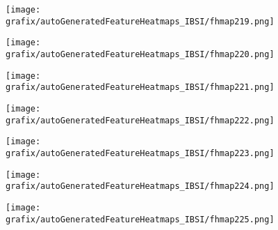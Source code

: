 \hspace{\hsp} 
\begin{subfigure}{\wid\textwidth} 
    \centering 
    \caption{\tiny \sffamily {}} 
    \vspace{\vsp} 
    \texttt{[image: grafix/autoGeneratedFeatureHeatmaps\_IBSI/fhmap219.png]} 
\end{subfigure} 
\hspace{\hsp} 
\begin{subfigure}{\wid\textwidth} 
    \centering 
    \caption{\tiny \sffamily {}} 
    \vspace{\vsp} 
    \texttt{[image: grafix/autoGeneratedFeatureHeatmaps\_IBSI/fhmap220.png]} 
\end{subfigure} 
\hspace{\hsp} 
\begin{subfigure}{\wid\textwidth} 
    \centering 
    \caption{\tiny \sffamily {}} 
    \vspace{\vsp} 
    \texttt{[image: grafix/autoGeneratedFeatureHeatmaps\_IBSI/fhmap221.png]} 
\end{subfigure} 
\hspace{\hsp} 
\begin{subfigure}{\wid\textwidth} 
    \centering 
    \caption{\tiny \sffamily {}} 
    \vspace{\vsp} 
    \texttt{[image: grafix/autoGeneratedFeatureHeatmaps\_IBSI/fhmap222.png]} 
\end{subfigure} 
\hspace{\hsp} 
\begin{subfigure}{\wid\textwidth} 
    \centering 
    \caption{\tiny \sffamily {}} 
    \vspace{\vsp} 
    \texttt{[image: grafix/autoGeneratedFeatureHeatmaps\_IBSI/fhmap223.png]} 
\end{subfigure} 
\hspace{\hsp} 
\begin{subfigure}{\wid\textwidth} 
    \centering 
    \caption{\tiny \sffamily {}} 
    \vspace{\vsp} 
    \texttt{[image: grafix/autoGeneratedFeatureHeatmaps\_IBSI/fhmap224.png]} 
\end{subfigure} 
\hspace{\hsp} 
\begin{subfigure}{\wid\textwidth} 
    \centering 
    \caption{\tiny \sffamily {}} 
    \vspace{\vsp} 
    \texttt{[image: grafix/autoGeneratedFeatureHeatmaps\_IBSI/fhmap225.png]} 
\end{subfigure} 
